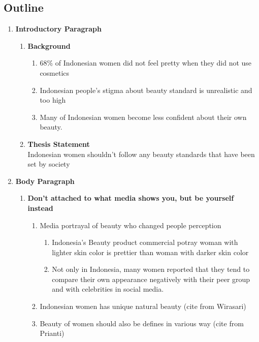 \documentclass[12pt]{article}
\begin{document}
    \subsection*{Outline}
    \begin{enumerate}[label*=\arabic*.]
        \item {\large\textbf{Introductory Paragraph}}
        \begin{enumerate}[label*=\arabic*.]
            \item \textbf{Background}
            \begin{enumerate}
                \item 68\% of Indonesian women did not feel pretty when they did not use cosmetics
                \item Indonesian people's stigma about beauty standard is unrealistic and too high
                \item Many of Indonesian women become less confident about their own beauty.
            \end{enumerate}
            \item \textbf{Thesis Statement} \\
        Indonesian women shouldn't follow any beauty standards that have been set by society
        \end{enumerate}
    \item {\large\textbf{Body Paragraph}}
        \begin{enumerate}[label*=\arabic*.]
        \item \textbf{Don't attached to what media shows you, but be yourself instead}
            \begin{enumerate}[label*=\arabic*.]
            \item Media portrayal of beauty who changed people perception
                \begin{enumerate}[label*=\arabic*.]
                \item Indonesia's Beauty product commercial potray woman with lighter skin color is prettier than woman with darker skin color
                \item Not only in Indonesia, many women reported that they tend to compare their own appearance negatively with their peer group and with celebrities in social media.
                \end{enumerate}
            \item Indonesian women has unique natural beauty (cite from Wirasari)
            \item Beauty of women should also be defines in various way (cite from Prianti)

\end{enumerate}
\end{enumerate}
\end{enumerate}
\end{document}
